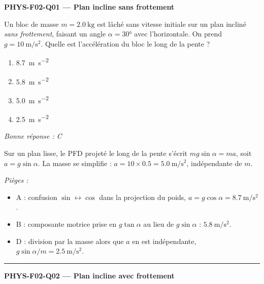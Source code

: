 \documentclass[11pt,a4paper]{article}
\newcommand{\vv}[1]{\vec{#1}}\newcommand{\ds}{\displaystyle}
\begin{document}
\noindent\textbf{PHYS-F02-Q01 --- Plan incline sans frottement}\par
Un bloc de masse $m=\qty{2.0}{\kilogram}$ est lâché sans vitesse initiale sur un plan incliné \emph{sans frottement}, faisant un angle $\alpha=\ang{30}$ avec l'horizontale. On prend $g=\qty{10}{\metre\per\second\squared}$. Quelle est l'accélération du bloc le long de la pente ?
\begin{center}
\end{center}
\begin{enumerate}[label=\Alph*)]
\item \qty{8.7}{\metre\per\second\squared}
\item \qty{5.8}{\metre\per\second\squared}
\item \qty{5.0}{\metre\per\second\squared}
\item \qty{2.5}{\metre\per\second\squared}
\end{enumerate}
\textit{Bonne réponse : C}\par
Sur un plan lisse, le PFD projeté le long de la pente s'écrit $mg\sin\alpha=ma$, soit $a=g\sin\alpha$. La masse se simplifie : $a=10\times\num{0.5}=\qty{5.0}{\metre\per\second\squared}$, indépendante de $m$.\par
\textit{Pièges :}
\begin{itemize}
\item A : confusion $\sin\leftrightarrow\cos$ dans la projection du poids, $a=g\cos\alpha=\qty{8.7}{\metre\per\second\squared}$.
\item B : composante motrice prise en $g\tan\alpha$ au lieu de $g\sin\alpha$ : $\qty{5.8}{\metre\per\second\squared}$.
\item D : division par la masse alors que $a$ en est indépendante, $g\sin\alpha/m=\qty{2.5}{\metre\per\second\squared}$.
\end{itemize}
\vspace{8pt}\hrule\vspace{8pt}
\noindent\textbf{PHYS-F02-Q02 --- Plan incline avec frottement}\par
\end{document}
